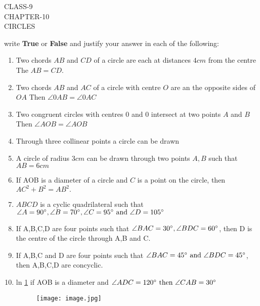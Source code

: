 \documentclass[12pt]{article}
\begin{document}
\begin{center}
\textbf\large{CLASS-9\\CHAPTER-10 \\ CIRCLES}
\end{center}
write \textbf{True} or \textbf{False} and justify your answer in each of the following:
\begin{enumerate}
\item Two chords $AB$ and $CD$ of a circle are each at distances $4 cm$ from the centre The $AB=CD$.
\item Two chords $AB$ and $AC$ of a circle with centre $O$ are an the opposite sides of $OA$ Then $\angle 0AB = \angle 0AC$
\item Two congruent circles with centres 0 and 0 intersect at two points $A$ and $B$ Then $\angle AOB= \angle AOB$
\item Through three collinear points a circle can be drawn
\item A circle of radius $3 cm$ can be drawn through two points $A,B$ such that $AB= 6cm$
\item If AOB is a diameter of a circle and $C$ is a point on the circle, then $AC^2+B^2=AB^2.$
\item $ABCD$ is a cyclic quadrilateral such that $\angle A=90\degree ,\angle B=70\degree, \angle C=95\degree \text{ and }\angle D=105\degree$
\item If A,B,C,D are four points such that $\angle BAC=30\degree, \angle BDC=60\degree$, then D is the centre of the circle through A,B  and C.
\item If A,B,C and D are four points such that $\angle BAC =45\degree \text{ and }\angle BDC=45\degree$, then A,B,C,D are concyclic.
\item ln \ref{fig:1} if AOB is a diameter and $\angle ADC=120\degree \text{ then }\angle CAB=30\degree$
\begin{figure}[h!]
 \begin{center} 
	 \texttt{[image: image.jpg]}
 \end{center}
\caption{}
	\label{fig:1}
\end{figure}
\end{enumerate}
\end{document}
